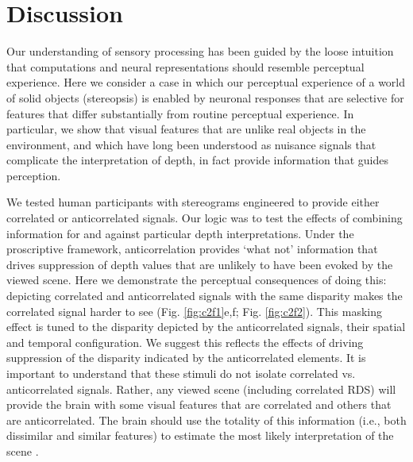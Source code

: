 \section{Discussion}
Our understanding of sensory processing has been guided by the loose intuition that computations and neural representations should resemble perceptual experience. Here we consider a case in which our perceptual experience of a world of solid objects (stereopsis) is enabled by neuronal responses that are selective for features that differ substantially from routine perceptual experience. In particular, we show that visual features that are unlike real objects in the environment, and which have long been understood as nuisance signals that complicate the interpretation of depth, in fact provide information that guides perception. 

We tested human participants with stereograms engineered to provide either correlated or anticorrelated signals. Our logic was to test the effects of combining information for and against particular depth interpretations. Under the proscriptive framework, anticorrelation provides `what not' information that drives suppression of depth values that are unlikely to have been evoked by the viewed scene. Here we demonstrate the perceptual consequences of doing this: depicting correlated and anticorrelated signals with the same disparity makes the correlated signal harder to see (Fig. \ref{fig:c2f1}e,f; Fig. \ref{fig:c2f2}). This masking effect is tuned to the disparity depicted by the anticorrelated signals, their spatial and temporal configuration. We suggest this reflects the effects of driving suppression of the disparity indicated by the anticorrelated elements. It is important to understand that these stimuli do not isolate correlated vs. anticorrelated signals. Rather, any viewed scene (including correlated RDS) will provide the brain with some visual features that are correlated and others that are anticorrelated. The brain should use the totality of this information (i.e., both dissimilar and similar features) to estimate the most likely interpretation of the scene \cite{Goncalves:2017aa}. 

